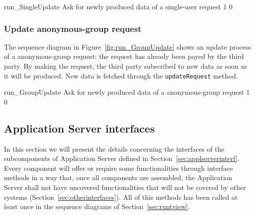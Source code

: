 \documentclass[../DD0.tex]{subfiles}
\begin{document}
      \fetchUML
        {run_SingleUpdate}
        {Ask for newly produced data of a single-user request}
        {1}           %
        {0}           %

  \clearpage

  \subsubsection{Update anonymous-group request}
    \label{sec:updatedata}

      The sequence diagram in Figure~\ref{fig:run_GroupUpdate} shows an update process of a anonymous-group request: the request has already been payed by the third party. By making the request, the third party subscribed to new data as soon as it will be produced. New data is fetched through the \texttt{updateRequest} method.

      \fetchUML
        {run_GroupUpdate}
        {Ask for newly produced data of a anonymous-group request}
        {1}           %
        {0}           %

  \clearpage

  \subsection{Application Server interfaces}
  \label{sec:compinterf}

    In this section we will present the details concerning the interfaces of the subcomponents of Application Server defined in Section~\ref{sec:applserverinterf}. Every component will offer or require some functionalities through interface methods in a way that, once all components are assembled, the Application Server shall not have uncovered functionalities that will not be covered by other systems (Section~\ref{sec:otherinterfaces}). All of this methods has been called at least once in the sequence diagrams of Section~\ref{sec:runtview}.

    \subsubsection{\AccountManager}
\end{document}

